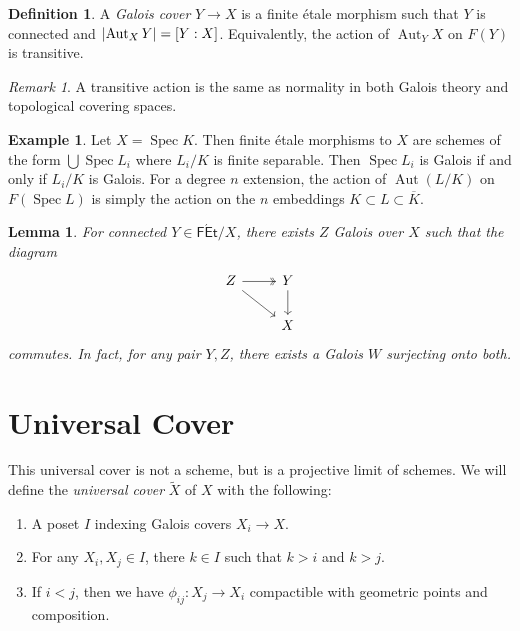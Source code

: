 \documentclass[leqno, openany]{memoir}
\newtheorem{lem}[thm]{Lemma}
\theoremstyle{definition}
\newtheorem{defn}[thm]{Definition}
\newtheorem{exm}[thm]{Example}
\theoremstyle{remark}
\newtheorem{rmk}[thm]{Remark}
\theoremstyle{plain}
\theoremstyle{definition}
\theoremstyle{remark}
\newcommand{\ms}[1]{\mathsf{#1}}
\newcommand{\ol}[1]{\overline{#1}}
\newcommand{\wt}[1]{\widetilde{#1}}
\DeclareMathOperator{\Aut}{Aut}
\DeclareMathOperator{\Spec}{Spec}
\begin{document}
\begin{defn}
    A \textit{Galois cover} $Y \to X$ is a finite \'etale morphism such that $Y$ is connected and $\abs{\Aut_X Y} = [Y:X]$. Equivalently, the action of $\Aut_Y X$ on $F(Y)$ is transitive.  
\end{defn}

\begin{rmk}
    A transitive action is the same as normality in both Galois theory and topological covering spaces.
\end{rmk}

\begin{exm}
    Let $X = \Spec K$. Then finite \'etale morphisms to $X$ are schemes of the form $\bigcup \Spec L_i$ where $L_i/K$ is finite separable. Then $\Spec L_i$ is Galois if and only if $L_i / K$ is Galois. For a degree $n$ extension, the action of $\Aut(L/K)$ on $F(\Spec L)$ is simply the action on the $n$ embeddings $K \subset L \subset \ol{K}$.
\end{exm}

\begin{lem}
    For connected $Y \in \ms{F\acute{E}t}/X$, there exists $Z$ Galois over $X$ such that the diagram
    \begin{equation*}
    \begin{tikzcd}
        Z \arrow[twoheadrightarrow]{r}  \arrow{dr} & Y \arrow{d} \\
                                                   & X
    \end{tikzcd}
    \end{equation*}
    commutes. In fact, for any pair $Y,Z$, there exists a Galois $W$ surjecting onto both.
\end{lem}

\section{Universal Cover}%
\label{sec:universal_cover}

This universal cover is not a scheme, but is a projective limit of schemes. We will define the \textit{universal cover} $\wt{X}$ of $X$ with the following:
\begin{enumerate}
    \item A poset $I$ indexing Galois covers $X_i \to X$.
    \item For any $X_i, X_j \in I$, there $k \in I$ such that $k > i$ and $k > j$.
    \item If $i < j$, then we have $\phi_{ij} \colon X_j \to X_i$ compactible with geometric points and composition.
\end{enumerate}
\end{document}
